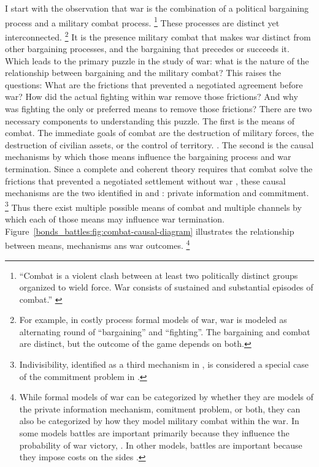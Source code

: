 I start with the observation that war is the combination of a political bargaining process and a military combat process. %
\footnote{%
  ``Combat is a violent clash between at least two politically
  distinct groups organized to wield force. War consists of sustained
  and substantial episodes of combat.'' \parencite{Reiter2003} %
} %
These processes are distinct yet interconnected.%
\footnote{%
  For example, in costly process formal models of war, war is modeled
  as alternating round of ``bargaining'' and ``fighting''. %
  The bargaining and combat are distinct, but the outcome of the game
  depends on both. %
} %
It is the presence military combat that makes war distinct from other bargaining processes, and the bargaining that precedes or succeeds it. %
Which leads to the primary puzzle in the study of war: what is the nature of the relationship between bargaining and the military combat?
This raises the questions:
What are the frictions that prevented a negotiated agreement before war?
How did the actual fighting within war remove those frictions?
And why was fighting the only or preferred means to remove those frictions?
There are two necessary components to understanding this puzzle. %
The first is the means of combat. %
The immediate goals of combat are the destruction of military forces, the destruction of civilian assets, or the control of territory.
\parencite[30]{Reiter2003}. %
The second is the causal mechanisms by which those means influence the bargaining process and war termination. %
Since a complete and coherent theory requires that combat solve the frictions that prevented a negotiated settlement without war \parencite{LeventogluSlantchev2007}, these causal mechanisms are the two identified in \textcite{Fearon1995} and \textcite{Powell2006}: private information and commitment.%
\footnote{Indivisibility, identified as a third mechanism in \textcite{Fearon1995}, is considered a special case of the commitment problem in \textcite{Powell2006}.}
Thus there exist multiple possible means of combat and multiple channels by which each of those means may influence war termination.
Figure~\ref{bonds_battles:fig:combat-causal-diagram} illustrates the relationship between means, mechanisms ans war outcomes.%
\footnote{
While formal models of war can be categorized by whether they are models of the private information mechanism, comitment problem, or both, they can also be categorized by how they model military combat within the war.
In some models battles are important primarily because they influence the probability of war victory, \parencites{Powell2004}{Wagner2000}{LeventogluSlantchev2007}{Slantchev2003}{SmithStam2004}.
In other models, battles are important because they impose costs on the sides \parencites{FilsonWerner2002}{Powell2004}{LeventogluSlantchev2007}. %
}

